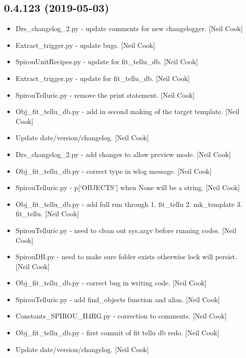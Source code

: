 \documentclass[a4paper,10pt,english]{report}
\begin{document}
\subsection{0.4.123 (2019-05-03)}
\label{\detokenize{misc/changelog:id136}}\begin{itemize}
\item {} 
Drs\_changelog\_2.py - update comments for new changelogger. {[}Neil Cook{]}

\item {} 
Extract\_trigger.py - update bugs. {[}Neil Cook{]}

\item {} 
SpirouUnitRecipes.py - update for fit\_tellu\_db. {[}Neil Cook{]}

\item {} 
Extract\_trigger.py - update for fit\_tellu\_db. {[}Neil Cook{]}

\item {} 
SpirouTelluric.py - remove the print statement. {[}Neil Cook{]}

\item {} 
Obj\_fit\_tellu\_db.py - add in second making of the target template.
{[}Neil Cook{]}

\item {} 
Update date/version/changelog. {[}Neil Cook{]}

\item {} 
Drs\_changelog\_2.py - add changes to allow preview mode. {[}Neil Cook{]}

\item {} 
Obj\_fit\_tellu\_db.py - correct type in wlog message. {[}Neil Cook{]}

\item {} 
SpirouTelluric.py - p{[}‘OBJECTS’{]} when None will be a string. {[}Neil
Cook{]}

\item {} 
Obj\_fit\_tellu\_db.py - add full run through 1. fit\_tellu 2. mk\_template
3. fit\_tellu. {[}Neil Cook{]}

\item {} 
SpirouTelluric.py - need to clean out sys.argv before running codes.
{[}Neil Cook{]}

\item {} 
SpirouDB.py - need to make sure folder exists otherwise lock will
persist. {[}Neil Cook{]}

\item {} 
Obj\_fit\_tellu\_db.py - correct bug in writing code. {[}Neil Cook{]}

\item {} 
SpirouTelluric.py - add find\_objects function and alias. {[}Neil Cook{]}

\item {} 
Constants\_SPIROU\_H4RG.py - correction to comments. {[}Neil Cook{]}

\item {} 
Obj\_fit\_tellu\_db.py - first commit of fit tellu db redo. {[}Neil Cook{]}

\item {} 
Update date/version/changelog. {[}Neil Cook{]}

\end{itemize}
\end{document}
